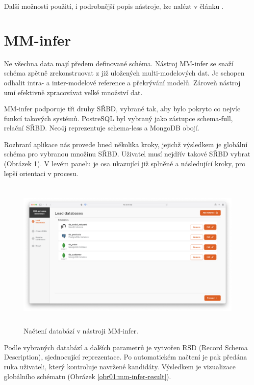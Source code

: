 Další možnosti použití, i podrobnější popis nástroje, lze nalézt v článku \cite{MM_cat}.


\section{MM-infer}

Ne všechna data mají předem definované schéma. Nástroj MM-infer se snaží schéma zpětně zrekonstruovat z již uložených multi-modelových dat. Je schopen odhalit intra- a inter-modelové reference a překrývání modelů. Zároveň nástroj umí efektivně zpracovávat velké množství dat.

MM-infer podporuje tři druhy SŘBD, vybrané tak, aby bylo pokryto co nejvíc funkcí takových systémů. PostreSQL byl vybraný jako zástupce schema-full, relační SŘBD. Neo4j reprezentuje schema-less a MongoDB obojí. 

Rozhraní aplikace nás provede hned několika kroky, jejichž výsledkem je globální schéma pro vybranou množinu SŘBD. Uživatel musí nejdřív takové SŘBD vybrat (Obrázek \ref{obr01:mm-infer-load-database}). V levém panelu je osa ukazující již splněné a následující kroky, pro lepší orientaci v procesu.

\begin{figure}[htb]
  \centering
  \includegraphics[height=75mm]{../img/mm-infer-load-database}
  \caption{Načtení databází v nástroji MM-infer.}
  \label{obr01:mm-infer-load-database}
\end{figure}

Podle vybraných databází a dalších parametrů je vytvořen RSD (Record Schema Description), sjednocující reprezentace. Po automatickém načtení je pak předána ruka uživateli, který kontroluje navržené kandidáty. Výsledkem je vizualizace globálního schématu (Obrázek \ref{obr01:mm-infer-result}).

